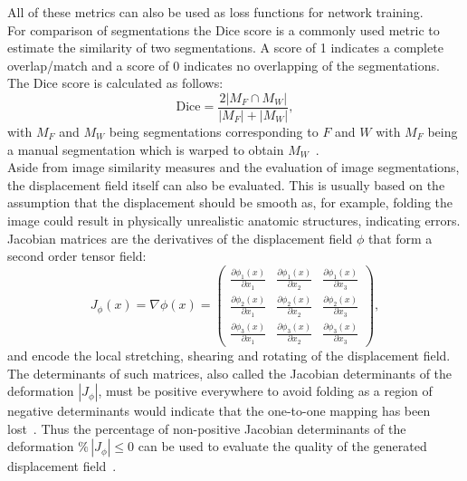 \documentclass[english,version-2022-01]{uzl-thesis} %
\begin{document}
All of these metrics can also be used as loss functions for network training.\\
For comparison of segmentations the Dice score is a commonly used metric to estimate the similarity of two segmentations. A score of 1 indicates a complete overlap/match and a score of 0 indicates no overlapping of the segmentations. The Dice score is calculated as follows:
\begin{equation}
	\text{Dice} = \frac{2 |M_F \cap M_W|}{|M_F| + |M_W|},
\end{equation}
with $M_F$ and $M_W$ being segmentations corresponding to $F$ and $W$ with $M_F$ being a manual segmentation which is warped to obtain $M_W$~\cite{NiftiReg}.\\
Aside from image similarity measures and the evaluation of image segmentations, the displacement field itself can also be evaluated. This is usually based on the assumption that the displacement should be smooth as, for example, folding the image could result in physically unrealistic anatomic structures, indicating errors. Jacobian matrices are the derivatives of the displacement field $\phi$ that form a second order tensor field:
\begin{equation}
	J_{\phi}(x) = \nabla \mathbb{\phi}  (x) = \begin{pmatrix}
	\frac{\partial \phi_1(x)}{\partial x_1} & \frac{\partial \phi_1(x)}{\partial x_2} & \frac{\partial \phi_1(x)}{\partial x_3} \\
	\frac{\partial \phi_2(x)}{\partial x_1} & \frac{\partial \phi_2(x)}{\partial x_2} & \frac{\partial \phi_2(x)}{\partial x_3} \\
	\frac{\partial \phi_3(x)}{\partial x_1} & \frac{\partial \phi_3(x)}{\partial x_2} & \frac{\partial \phi_3(x)}{\partial x_3} 
	\end{pmatrix},
\end{equation}
and encode the local stretching, shearing and rotating of the displacement field. The determinants of such matrices, also called the Jacobian determinants of the deformation $|J_{\phi}|$, must be positive everywhere to avoid folding as a region of negative determinants would indicate that the one-to-one mapping has been lost~\cite{DARTEL}. Thus the percentage of non-positive Jacobian determinants of the deformation $\% \, |J_{\phi}|\leq0$ can be used to evaluate the quality of the generated displacement field~\cite{Chen2023}.


\end{document}
